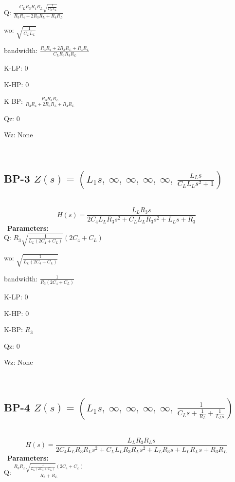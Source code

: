 \documentclass{article}
\begin{document}
Q: $\frac{C_{L} R_{3} R_{4} R_{L} \sqrt{\frac{1}{C_{L} L_{L}}}}{R_{3} R_{4} + 2 R_{3} R_{L} + R_{4} R_{L}}$\ 

wo: $\sqrt{\frac{1}{C_{L} L_{L}}}$\ 

bandwidth: $\frac{R_{3} R_{4} + 2 R_{3} R_{L} + R_{4} R_{L}}{C_{L} R_{3} R_{4} R_{L}}$\ 

K-LP: $0$\ 

K-HP: $0$\ 

K-BP: $\frac{R_{3} R_{4} R_{L}}{R_{3} R_{4} + 2 R_{3} R_{L} + R_{4} R_{L}}$\ 

Qz: $0$\ 

Wz: $\text{None}$\ 

\ 

\subsection{BP-3 $Z(s) = \left( L_{1} s, \  \infty, \  \infty, \  \infty, \  \infty, \  \frac{L_{L} s}{C_{L} L_{L} s^{2} + 1}\right)$ } \ 
\textbf{\[H(s) = \frac{L_{L} R_{3} s}{2 C_{4} L_{L} R_{3} s^{2} + C_{L} L_{L} R_{3} s^{2} + L_{L} s + R_{3}}\] } \ 
\textbf{Parameters:}\\ 

Q: $R_{3} \sqrt{\frac{1}{L_{L} \left(2 C_{4} + C_{L}\right)}} \left(2 C_{4} + C_{L}\right)$\ 

wo: $\sqrt{\frac{1}{L_{L} \left(2 C_{4} + C_{L}\right)}}$\ 

bandwidth: $\frac{1}{R_{3} \left(2 C_{4} + C_{L}\right)}$\ 

K-LP: $0$\ 

K-HP: $0$\ 

K-BP: $R_{3}$\ 

Qz: $0$\ 

Wz: $\text{None}$\ 

\ 

\subsection{BP-4 $Z(s) = \left( L_{1} s, \  \infty, \  \infty, \  \infty, \  \infty, \  \frac{1}{C_{L} s + \frac{1}{R_{L}} + \frac{1}{L_{L} s}}\right)$ } \ 
\textbf{\[H(s) = \frac{L_{L} R_{3} R_{L} s}{2 C_{4} L_{L} R_{3} R_{L} s^{2} + C_{L} L_{L} R_{3} R_{L} s^{2} + L_{L} R_{3} s + L_{L} R_{L} s + R_{3} R_{L}}\] } \ 
\textbf{Parameters:}\\ 

Q: $\frac{R_{3} R_{L} \sqrt{\frac{1}{L_{L} \left(2 C_{4} + C_{L}\right)}} \left(2 C_{4} + C_{L}\right)}{R_{3} + R_{L}}$\ 
\end{document}
